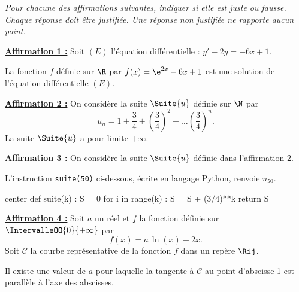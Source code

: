 \emph{Pour chacune des affirmations suivantes, indiquer si elle est juste ou fausse. Chaque réponse doit être justifiée. Une réponse non justifiée ne rapporte aucun point.}

\vspace*{0.75cm}

\textbf{\underline{Affirmation 1 :}} Soit $(E)$ l’équation différentielle : $y' - 2y = -6x +1$.

\medskip

La fonction $f$ définie sur $\R$ par $f(x)=\e^{2x}-6x+1$ est une solution de l’équation différentielle $(E)$.

\bigskip

\textbf{\underline{Affirmation 2 :}} On considère la suite $\Suite{u}$ définie sur $\N$ par%
\[ u_n  = 1 + \frac34 + {\left(\frac34\right)}^2 + \ldots {\left(\frac34\right)}^n. \]
La suite $\Suite{u}$ a pour limite $+\infty$.

\bigskip

\textbf{\underline{Affirmation 3 :}} On considère la suite $\Suite{u}$ définie dans l’affirmation 2.

\medskip

L’instruction \texttt{suite(50)} ci-dessous, écrite en langage \textsf{Python}, renvoie $u_{50}$.

\begin{CodePythonLstAlt}[Largeur=0.4\linewidth]{center}
def suite(k) :
	S = 0
	for i in range(k) :
		S = S + (3/4)**k
	return S
\end{CodePythonLstAlt}

\bigskip

\textbf{\underline{Affirmation 4 :}} Soit $a$ un réel et $f$ la fonction définie sur $\IntervalleOO{0}{+\infty}$ par%
\[ f(x)=a\,\ln(x)-2x. \]
Soit $\mathcal{C}$ la courbe représentative de la fonction $f$ dans un repère $\Rij$.

\smallskip

Il existe une valeur de $a$ pour laquelle la tangente à $\mathcal{C}$ au point d’abscisse 1 est parallèle à l’axe des abscisses.